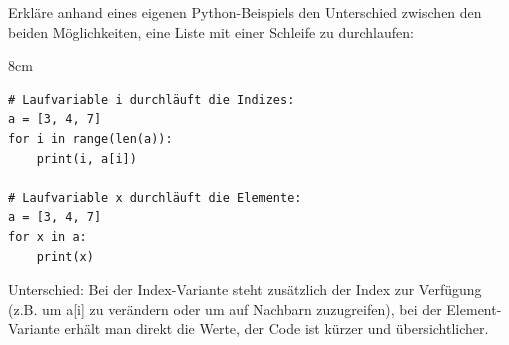 \question[5]
Erkläre anhand eines eigenen Python-Beispiels den Unterschied zwischen den beiden
Möglichkeiten, eine Liste mit einer Schleife zu durchlaufen:

\begin{solutionbox}{8cm}
\begin{lstlisting}
# Laufvariable i durchläuft die Indizes:
a = [3, 4, 7]
for i in range(len(a)):
    print(i, a[i])

# Laufvariable x durchläuft die Elemente:
a = [3, 4, 7]
for x in a:
    print(x)
\end{lstlisting}

Unterschied: Bei der Index-Variante steht zusätzlich der
Index zur Verfügung (z.B. um a[i] zu verändern oder um auf Nachbarn zuzugreifen), bei der
Element-Variante erhält man direkt die Werte, der Code
ist kürzer und übersichtlicher.

\end{solutionbox}